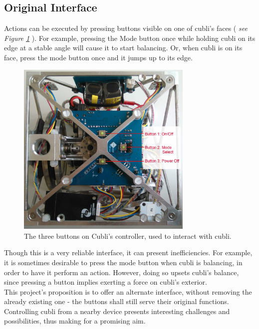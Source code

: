 \subsection{Original Interface}
 
Actions can be executed by pressing buttons visible on one of cubli's faces ( \textit{see Figure \ref{img:Buttons}} ). For example, pressing the Mode button once while holding cubli on its edge at a stable angle will cause it to start balancing. Or, when cubli is on its face, press the mode button once and it jumps up to its edge.\\

\begin{figure}[ht]
   \centering
   \includegraphics[width=0.75\textwidth]{img/Buttons.jpg}
   \caption{The three buttons on Cubli's controller, used to interact with cubli.}
   \label{img:Buttons}
\end{figure}

Though this is a very reliable interface, it can present inefficiencies. For example, it is sometimes desirable to press the mode button when cubli is balancing, in order to have it perform an action. However, doing so upsets cubli's balance, since pressing a button implies exerting a force on cubli's exterior.\\

This project's proposition is to offer an alternate interface, without removing the already existing one - the buttons shall still serve their original functions. Controlling cubli from a nearby device presents interesting challenges and possibilities, thus making for a promising aim.

